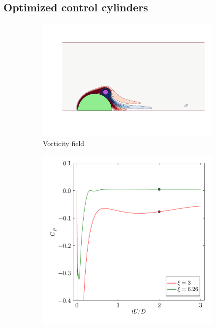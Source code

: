\documentclass[10pt,a4paper]{article}
\begin{document}
\subsection{Optimized control cylinders}

\begin{figure}
    \centering
    \begin{subfigure}[t]{0.8\linewidth}
        \centering
        \includegraphics[width=\linewidth,trim={50 70 20 210},clip]{img/SpinCylFlood.pdf}
        \vspace{-1cm}
        \caption{Vorticity field}
    \end{subfigure}
    \begin{subfigure}[b]{0.38\linewidth}
        \includegraphics[width=\linewidth]{img/SpinCylHist.pdf}

\end{subfigure}
\end{figure}
\end{document}
